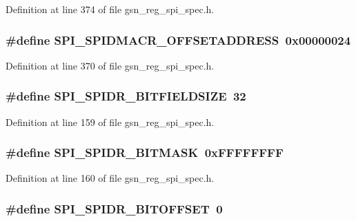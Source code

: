 Definition at line 374 of file gsn\_\-reg\_\-spi\_\-spec.h.

\hypertarget{a00573_a98d31fef51cbbd7c7f15228b340f339b}{
\subsubsection[{SPI\_\-SPIDMACR\_\-OFFSETADDRESS}]{\setlength{\rightskip}{0pt plus 5cm}\#define SPI\_\-SPIDMACR\_\-OFFSETADDRESS~0x00000024}}
\label{a00573_a98d31fef51cbbd7c7f15228b340f339b}


Definition at line 370 of file gsn\_\-reg\_\-spi\_\-spec.h.

\hypertarget{a00573_a5450afb7342d269a595c7b6eaea9a9e3}{
\subsubsection[{SPI\_\-SPIDR\_\-BITFIELDSIZE}]{\setlength{\rightskip}{0pt plus 5cm}\#define SPI\_\-SPIDR\_\-BITFIELDSIZE~32}}
\label{a00573_a5450afb7342d269a595c7b6eaea9a9e3}


Definition at line 159 of file gsn\_\-reg\_\-spi\_\-spec.h.

\hypertarget{a00573_a5abaa540effda73cde59e303cc5d6993}{
\subsubsection[{SPI\_\-SPIDR\_\-BITMASK}]{\setlength{\rightskip}{0pt plus 5cm}\#define SPI\_\-SPIDR\_\-BITMASK~0xFFFFFFFF}}
\label{a00573_a5abaa540effda73cde59e303cc5d6993}


Definition at line 160 of file gsn\_\-reg\_\-spi\_\-spec.h.

\hypertarget{a00573_a3ab67f6ddbb675849cde7f8cc3d2b960}{
\subsubsection[{SPI\_\-SPIDR\_\-BITOFFSET}]{\setlength{\rightskip}{0pt plus 5cm}\#define SPI\_\-SPIDR\_\-BITOFFSET~0}}
\label{a00573_a3ab67f6ddbb675849cde7f8cc3d2b960}


